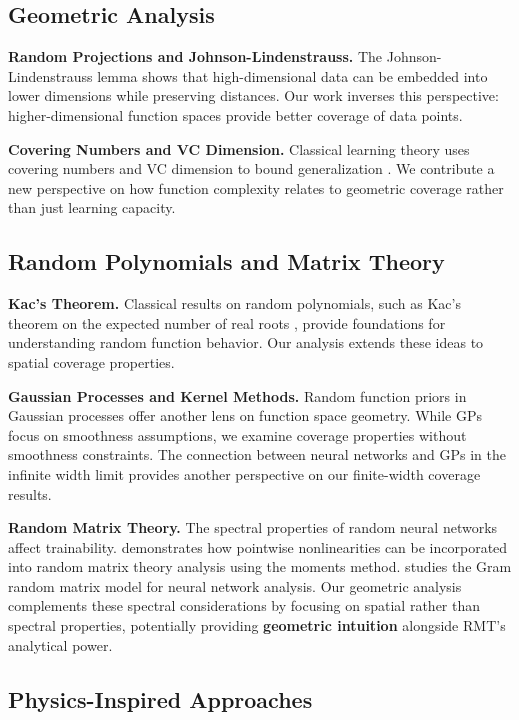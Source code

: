 \subsection{Geometric Analysis}

\textbf{Random Projections and Johnson-Lindenstrauss.} The Johnson-Lindenstrauss lemma shows that high-dimensional data can be embedded into lower dimensions while preserving distances. Our work inverses this perspective: higher-dimensional function spaces provide better coverage of data points.

\textbf{Covering Numbers and VC Dimension.} Classical learning theory uses covering numbers and VC dimension to bound generalization \cite{Vapnik1971ChervonenkisOT}. We contribute a new perspective on how function complexity relates to geometric coverage rather than just learning capacity.

\subsection{Random Polynomials and Matrix Theory}

\textbf{Kac's Theorem.} Classical results on random polynomials, such as Kac's theorem on the expected number of real roots \cite{Kac1943ACT}, provide foundations for understanding random function behavior. Our analysis extends these ideas to spatial coverage properties.

\textbf{Gaussian Processes and Kernel Methods.} Random function priors in Gaussian processes \cite{Neal1995BayesianLF} offer another lens on function space geometry. While GPs focus on smoothness assumptions, we examine coverage properties without smoothness constraints. The connection between neural networks and GPs in the infinite width limit \cite{Matthews2018GaussianPB} provides another perspective on our finite-width coverage results.

\textbf{Random Matrix Theory.} The spectral properties of random neural networks \cite{Pennington2017ResurrectingTS} affect trainability. \cite{Pennington2017NonlinearRandom} demonstrates how pointwise nonlinearities can be incorporated into random matrix theory analysis using the moments method. \cite{Louart2017RandomMatrix} studies the Gram random matrix model for neural network analysis. Our geometric analysis complements these spectral considerations by focusing on spatial rather than spectral properties, potentially providing \textbf{geometric intuition} alongside RMT's analytical power.

\subsection{Physics-Inspired Approaches}

